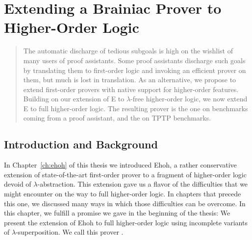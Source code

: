 \chapter{Extending a Brainiac Prover to Higher-Order Logic}
\label{ch:ehoh2}






\begin{abstract}%
    The automatic discharge of tedious subgoals is high on the wishlist of many
  users of proof assistants. Some proof assistants discharge such goals
  by translating them to first-order logic and invoking an efficient prover on
  them, but much is lost in translation. As an alternative,
  we propose to extend first-order provers with native support for
  higher-order features. Building on our extension of E to $\lambda$-free
  higher-order logic, we now extend E to full higher-order logic.
  The resulting prover is the  one on benchmarks coming from a
  proof assistant, and the  on TPTP benchmarks.
\end{abstract}

\newpage

\section{Introduction and Background}
\label{sec:ehoh2:introduction}

In Chapter~\ref{ch:ehoh} of this thesis we introduced Ehoh, a rather conservative extension of
state-of-the-art first-order prover to a fragment of higher-order logic devoid of $\lambda$-abstraction. This
extension gave us a flavor of the difficulties that we might encounter on the
way to full higher-order logic. In chapters that precede this one,
we discussed many ways in which those difficulties can be overcome.
In this chapter, we fulfill a promise we gave in the beginning of the thesis: We present the extension of
Ehoh to full higher-order logic using incomplete variants
of $\lambda$-superposition. We call this prover \ehohii.

